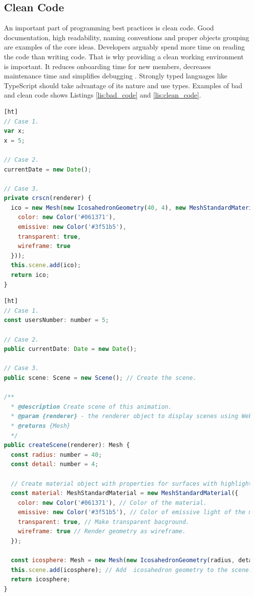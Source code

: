 \documentclass{article} %
\begin{document}
\subsection{Clean Code}
An important part of programming best practices is clean code. Good documentation, high readability, naming conventions and proper objects grouping are examples of the core ideas. Developers arguably spend more time on reading the code than writing code. That is why providing a clean working environment is important. It reduces onboarding time for new members, decreases maintenance time and simplifies debugging \cite{bib:cleancode}. Strongly typed languages like TypeScript should take advantage of its nature and use types. Examples of bad and clean code shows Listings \ref{lis:bad_code} and \ref{lis:clean_code}.
\begin{lstlisting}[language=JavaScript,firstnumber=1,label={lis:bad_code},caption={Bad code in TypeScript\index{TypeScript}.}][ht]
// Case 1.
var x;
x = 5;

// Case 2.
currentDate = new Date();

// Case 3.
private crscn(renderer) {
  ico = new Mesh(new IcosahedronGeometry(40, 4), new MeshStandardMaterial({
    color: new Color('#061371'),
    emissive: new Color('#3f51b5'),
    transparent: true,
    wireframe: true
  }));
  this.scene.add(ico);
  return ico;
}
\end{lstlisting}
\begin{lstlisting}[language=JavaScript,firstnumber=1,label={lis:clean_code},caption={Clean code\index{Clean code} in TypeScript\index{TypeScript}.}][ht]
// Case 1.
const usersNumber: number = 5;

// Case 2.
public currentDate: Date = new Date();

// Case 3.
public scene: Scene = new Scene(); // Create the scene.

/**
  * @description Create scene of this animation.
  * @param {renderer} - the renderer object to display scenes using WebGL.
  * @returns {Mesh}
  */
public createScene(renderer): Mesh {
  const radius: number = 40;
  const detail: number = 4;
  
  // Create material object with properties for surfaces with highlights.
  const material: MeshStandardMaterial = new MeshStandardMaterial({
    color: new Color('#061371'), // Color of the material.
    emissive: new Color('#3f51b5'), // Color of emissive light of the material.
    transparent: true, // Make transparent bacground.
    wireframe: true // Render geometry as wireframe.
  });

  const icosphere: Mesh = new Mesh(new IcosahedronGeometry(radius, detail), material); // Create the icosahedron geometry.
  this.scene.add(icosphere); // Add  icosahedron geometry to the scene.
  return icosphere;
}
\end{lstlisting}
\end{document}

